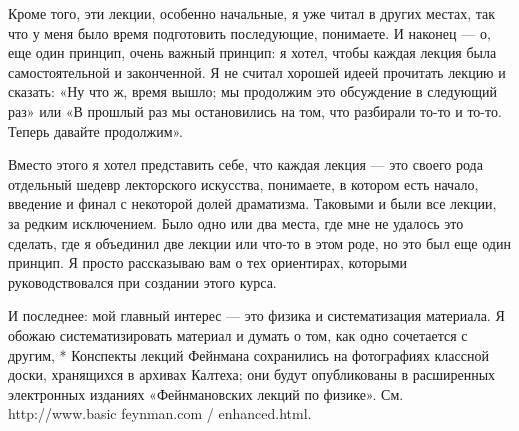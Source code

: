 \documentclass[10pt,oneside]{article}
\begin{document}
Кроме того, эти лекции, особенно начальные, я уже читал в других местах, так что у меня было время подготовить последующие, понимаете. И наконец --- о, еще один принцип, очень важный принцип: я хотел, чтобы каждая лекция была самостоятельной и законченной. Я не считал хорошей идеей прочитать лекцию и сказать: «Ну что ж, время вышло; мы продолжим это обсуждение в следующий раз» или «В прошлый раз мы остановились на том, что разбирали то-то и то-то. Теперь давайте продолжим».\par

Вместо этого я хотел представить себе, что каждая лекция --- это своего рода отдельный шедевр лекторского искусства, понимаете, в котором есть начало, введение и финал с некоторой долей драматизма. Таковыми и были все лекции, за редким исключением. Было одно или два места, где мне не удалось это сделать, где я объединил две лекции или что-то в этом роде, но это был еще один принцип. Я просто рассказываю вам о тех ориентирах, которыми руководствовался при создании этого курса.\par

И последнее: мой главный интерес --- это физика и систематизация материала. Я обожаю систематизировать материал и думать о том, как одно сочетается с другим, * Конспекты лекций Фейнмана сохранились на фотографиях классной доски, хранящихся в архивах Калтеха; они будут опубликованы в расширенных электронных изданиях «Фейнмановских лекций по физике». См. http://www.basic feynman.com / enhanced.html.\par
\end{document}
